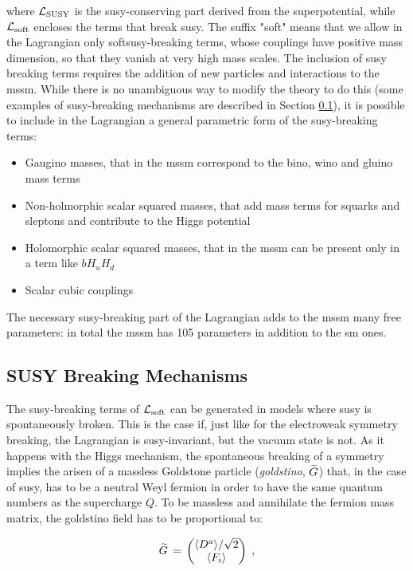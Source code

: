 \noindent where $\mathcal{L}_{\rm SUSY}$ is the \gls{susy}-conserving part derived from the superpotential, while $\mathcal{L}_{\rm soft}$ encloses the terms that break \gls{susy}. The suffix "soft" means that we allow in the Lagrangian only soft\gls{susy}-breaking terms, whose couplings have positive mass dimension, so that they vanish at very high mass scales. The inclusion of \gls{susy} breaking terms requires the addition of new particles and interactions to the \gls{mssm}. While there is no unambiguous way to modify the theory to do this (some examples of \gls{susy}-breaking mechanisms are described in Section \ref{sec:susybreaking}), it is possible to include in the Lagrangian a general parametric form of the \gls{susy}-breaking terms:
\begin{itemize}
\item Gaugino masses, that in the \gls{mssm} correspond to the bino, wino and gluino mass terms
\item Non-holmorphic scalar squared masses, that add mass terms for squarks and sleptons and contribute to the Higgs potential
\item Holomorphic scalar squared masses, that in the \gls{mssm} can be present only in a term like $b H_u H_d$
\item Scalar cubic couplings
\end{itemize}  

The necessary susy-breaking part of the Lagrangian adds to the \gls{mssm} many free parameters: in total the \gls{mssm} has 105 parameters in addition to the \gls{sm} ones.


\subsection{SUSY Breaking Mechanisms}
\label{sec:susybreaking}

The \gls{susy}-breaking terms of $\mathcal{L}_{\rm soft}$ can be generated in models where \gls{susy} is spontaneously broken. This is the case if, just like  for the electroweak symmetry breaking, the Lagrangian is \gls{susy}-invariant, but the vacuum state is not. As it happens with the Higgs mechanism, the spontaneous breaking of a symmetry implies the arisen of a massless Goldstone particle (\textit{goldstino}, $\widetilde{G}$) that, in the case of \gls{susy}, has to be a neutral Weyl fermion in order to have the same quantum numbers as the supercharge $Q$. To be massless and annihilate the fermion mass matrix, the goldstino field has to be proportional to:

\begin{equation}
 \widetilde{G} \,=\, 
 \begin{pmatrix}
\langle D^a \rangle /\sqrt{2} \cr \langle F_i\rangle 
\end{pmatrix} \; ,
\label{explicitgoldstino}
\end{equation} 

